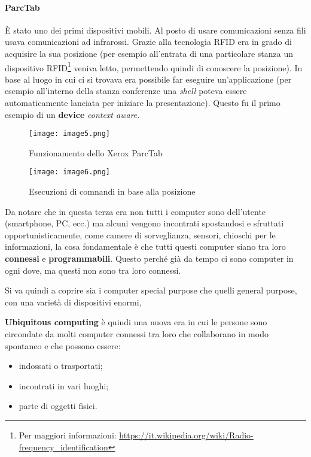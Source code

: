 \paragraph*{ParcTab} \`E stato uno dei primi dispositivi mobili. Al posto di
usare comunicazioni senza fili usava comunicazioni ad infrarossi. Grazie alla
tecnologia RFID era in grado di acquisire la sua posizione (per esempio
all'entrata di una particolare stanza un dispositivo RFID\footnote{Per
maggiori informazioni:
\url{https://it.wikipedia.org/wiki/Radio-frequency_identification}} veniva
letto, permettendo quindi di conoscere la posizione). In base al luogo in cui ci
si trovava era possibile far eseguire un'applicazione (per esempio all'interno
della stanza conferenze una \textit{shell} poteva essere automaticamente
lanciata per iniziare la presentazione). Questo fu il primo esempio di un
\textbf{device} \textit{context aware}.

\begin{figure}[H]
  \texttt{[image: image5.png]}
  \caption{Funzionamento dello Xerox ParcTab}
\endminipage \hspace{75pt}
  \texttt{[image: image6.png]}
  \caption{Esecuzioni di comnandi in base alla posizione}
\endminipage
\end{figure}

Da notare che in questa terza era non tutti i computer sono dell'utente
(smartphone, PC, ecc.) ma alcuni vengono incontrati spostandosi e
sfruttati opportunisticamente, come camere di sorveglianza, sensori,
chioschi per le informazioni, la cosa fondamentale è che tutti questi
computer siano tra loro \textbf{connessi} e \textbf{programmabili}.
Questo perché già da tempo ci sono computer in ogni dove, ma questi non
sono tra loro connessi.

Si va quindi a coprire sia i computer special purpose che quelli general
purpose, con una varietà di dispositivi enormi,

\textbf{Ubiquitous computing} è quindi una nuova era in cui le persone
sono circondate da molti computer connessi tra loro che collaborano in
modo spontaneo e che possono essere:

\begin{itemize}
\item indossati o trasportati;
\item incontrati in vari luoghi;
\item parte di oggetti fisici.
\end{itemize}


